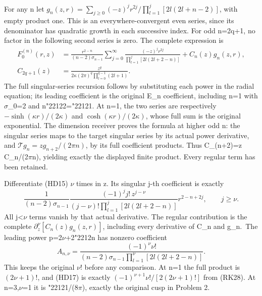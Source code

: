 \documentclass[
  11pt,
]{article}
\begin{document}
For any n let
\(g_n(z,r)=\sum_{j\geq0}(-z)^jr^{2j}/\prod_{l=1}^j[2l(2l+n-2)]\), with
empty product one. This is an everywhere-convergent even series, since
its denominator has quadratic growth in each successive index. For odd
n=2q+1, no factor in the following second series is zero. The complete
expression is \[
\begin{split}
F_0^{(n)}(r,z)
&=\frac{r^{2-n}}{(n-2)\sigma_{n-1}}
       \sum_{j=0}^\infty
       \frac{(-z)^jr^{2j}}{\prod_{l=1}^j[2l(2l+2-n)]}
       +C_n(z)g_n(z,r),\\
C_{2q+1}(z)
&=\frac{z^q}{2\kappa(2\pi)^q
                      \prod_{l=0}^{q-1}(2l+1)}.
\end{split}
\tag{HD15}
\] The full singular-series recursion follows by substituting each power
in the radial equation; its leading coefficient is the original E\_n
coefficient, including n=1 with \ensuremath{\sigma}\_0=2 and n{\ReaderSymbols\char"2212}2={\ReaderSymbols\char"2212}1. At n=1, the two
series are respectively \(-\sinh(\kappa r)/(2\kappa)\) and
\(\cosh(\kappa r)/(2\kappa)\), whose full sum is the original
exponential. The dimension receiver proves the formula at higher odd n:
the singular series maps to the target singular series by its actual
power derivative, and \(\mathcal T g_n=z g_{n+2}/(2\pi n)\), by its full
coefficient products. Thus C\_(n+2)=z C\_n/(2\ensuremath{\pi}n), yielding exactly the
displayed finite product. Every regular term has been retained.

Differentiate (HD15) \ensuremath{\nu} times in z. Its singular j-th coefficient is
exactly \[
\frac1{(n-2)\sigma_{n-1}}
\frac{(-1)^j j!\,z^{j-\nu}}
     {(j-\nu)!\prod_{l=1}^j[2l(2l+2-n)]}
       r^{2-n+2j},\qquad j\geq\nu.
\tag{HD16}
\] All j\textless \ensuremath{\nu} terms vanish by that actual derivative. The regular
contribution is the complete \(\partial_z^\nu[C_n(z)g_n(z,r)]\),
including every derivative of C\_n and g\_n.~The leading power p=2\ensuremath{\nu}+2{\ReaderSymbols\char"2212}n
has nonzero coefficient \[
A_{n,\nu}=\frac{(-1)^\nu\nu!}
 {(n-2)\sigma_{n-1}\prod_{l=1}^\nu[2l(2l+2-n)]}.
\tag{HD17}
\] This keeps the original \ensuremath{\nu}! before any comparison. At n=1 the full
product is \((2\nu+1)!\), and (HD17) is exactly
\((-1)^{\nu+1}\nu!/[2(2\nu+1)!]\) from (RK28). At n=3,\ensuremath{\nu}=1 it is {\ReaderSymbols\char"2212}1/(8\ensuremath{\pi}),
exactly the original cusp in Problem 2.
\end{document}
